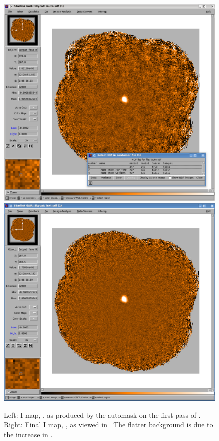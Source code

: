 \begin{figure}[t!]
\begin{center}
\includegraphics[width=0.46\linewidth]{sc22-gaia-view-iauto.png}
\includegraphics[width=0.46\linewidth]{sc22-gaia-view-iext.png}
\label{fig:gaia-iext}
\caption [Final I map in GAIA]{
  \small Left: I map, , as produced by the automask on the first pass
         of . Right: Final I map, , as viewed in \GAIA.
         The flatter background is due to the increase in .
}
\end{center}
\end{figure}


